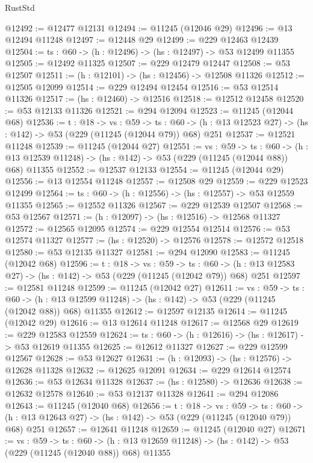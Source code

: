 \begin{lexlean}{RustStd}
\begin{coremodule}
@12492 := @12477 @12131
@12494 := @11245 (@12046 @29)
@12496 := @13 @12494 @11248
@12497 := @12448 @29
@12499 := @229 @12463 @12439
@12504 := {ts : @60} -> (h : @12496) -> (hs : @12497) -> @53 @12499 @11355
@12505 := @12492 @11325
@12507 := @229 @12479 @12447
@12508 := @53 @12507
@12511 := (h : @12101) -> (hs : @12456) -> @12508 @11326
@12512 := @12505 @12099
@12514 := @229 @12494 @12454
@12516 := @53 @12514 @11326
@12517 := (hs : @12460) -> @12516
@12518 := @12512 @12458
@12520 := @53 @12133 @11326
@12521 := @294 @12094
@12523 := @11245 (@12044 @68)
@12536 := {t : @18} ->
  {vs : @59} ->
  {ts : @60} -> (h : @13 @12523 @27) -> (hs : @142) -> @53 (@229 (@11245 (@12044 @79)) @68) @251
@12537 := @12521 @11248
@12539 := @11245 (@12044 @27)
@12551 := {vs : @59} ->
  {ts : @60} ->
  (h : @13 @12539 @11248) -> (hs : @142) -> @53 (@229 (@11245 (@12044 @88)) @68) @11355
@12552 := @12537 @12133
@12554 := @11245 (@12044 @29)
@12556 := @13 @12554 @11248
@12557 := @12508 @29
@12559 := @229 @12523 @12499
@12564 := {ts : @60} -> (h : @12556) -> (hs : @12557) -> @53 @12559 @11355
@12565 := @12552 @11326
@12567 := @229 @12539 @12507
@12568 := @53 @12567
@12571 := (h : @12097) -> (hs : @12516) -> @12568 @11327
@12572 := @12565 @12095
@12574 := @229 @12554 @12514
@12576 := @53 @12574 @11327
@12577 := (hs : @12520) -> @12576
@12578 := @12572 @12518
@12580 := @53 @12135 @11327
@12581 := @294 @12090
@12583 := @11245 (@12042 @68)
@12596 := {t : @18} ->
  {vs : @59} ->
  {ts : @60} -> (h : @13 @12583 @27) -> (hs : @142) -> @53 (@229 (@11245 (@12042 @79)) @68) @251
@12597 := @12581 @11248
@12599 := @11245 (@12042 @27)
@12611 := {vs : @59} ->
  {ts : @60} ->
  (h : @13 @12599 @11248) -> (hs : @142) -> @53 (@229 (@11245 (@12042 @88)) @68) @11355
@12612 := @12597 @12135
@12614 := @11245 (@12042 @29)
@12616 := @13 @12614 @11248
@12617 := @12568 @29
@12619 := @229 @12583 @12559
@12624 := {ts : @60} -> (h : @12616) -> (hs : @12617) -> @53 @12619 @11355
@12625 := @12612 @11327
@12627 := @229 @12599 @12567
@12628 := @53 @12627
@12631 := (h : @12093) -> (hs : @12576) -> @12628 @11328
@12632 := @12625 @12091
@12634 := @229 @12614 @12574
@12636 := @53 @12634 @11328
@12637 := (hs : @12580) -> @12636
@12638 := @12632 @12578
@12640 := @53 @12137 @11328
@12641 := @294 @12086
@12643 := @11245 (@12040 @68)
@12656 := {t : @18} ->
  {vs : @59} ->
  {ts : @60} -> (h : @13 @12643 @27) -> (hs : @142) -> @53 (@229 (@11245 (@12040 @79)) @68) @251
@12657 := @12641 @11248
@12659 := @11245 (@12040 @27)
@12671 := {vs : @59} ->
  {ts : @60} ->
  (h : @13 @12659 @11248) -> (hs : @142) -> @53 (@229 (@11245 (@12040 @88)) @68) @11355

\end{coremodule}
\end{lexlean}
